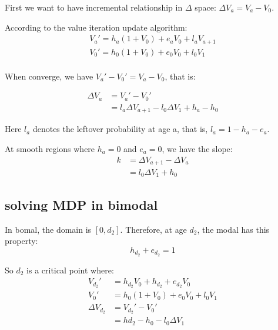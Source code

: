 \documentclass[12pt, letterpaper]{article}
\begin{document}
First we want to have incremental relationship in $\Delta$ space: $\Delta V_a = V_a - V_0$.

According to the value iteration update algorithm:
\begin{equation}
\begin{aligned}
V_a' = h_a (1+V_0) + e_a V_0 + l_a V_{a+1} \\
V_0' = h_0 (1+V_0) + e_0 V_0 + l_0 V_1 \\
\end{aligned}
\end{equation}

When converge, we have $V_a' - V_0' = V_a - V_0 $, that is:

\begin{equation}
\begin{aligned}
\Delta V_a & = V_a' - V_0' \\
 & = l_a \Delta V_{a+1} - l_0 \Delta V_1 + h_a - h_0
\end{aligned}
\end{equation}

Here $l_a$ denotes the leftover probability at age a, that is, $l_a = 1- h_a -
e_a$.

At smooth regions where $h_a = 0$ and $e_a = 0$, we have the slope:
\begin{equation}
\begin{aligned}
k & = \Delta V_{a+1} - \Delta V_a \\
& = l_0 \Delta V_1 + h_0
\end{aligned}
\end{equation}

\subsection{solving MDP in bimodal}

In bomal, the domain is $[0,d_2]$. Therefore, at age $d_2$, the modal has this property:
\begin{equation}
h_{d_2} + e_{d_2} = 1
\end{equation}

So $d_2$ is a critical point where:
\begin{equation}
\begin{aligned}
V_{d_2}' & = h_{d_2} V_0 + h_{d_2} + e_{d_2} V_0 \\
V_0' & = h_0 (1+V_0) + e_0 V_0 + l_0 V_1 \\
\Delta V_{d_2} & = V_{d_2}' - V_0' \\
& = h{d_2} - h_0 - l_0 \Delta V_1
\end{aligned}
\end{equation}
\end{document}
